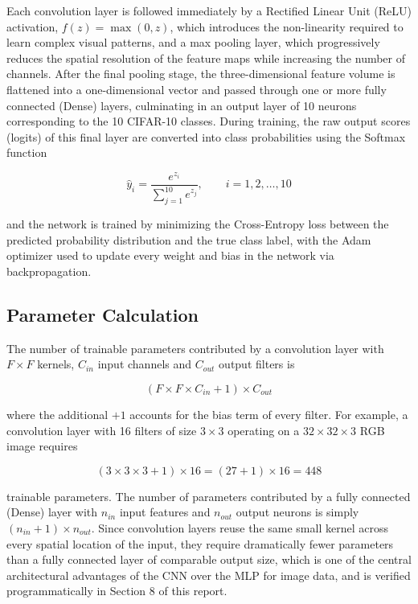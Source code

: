 \documentclass[11pt,a4paper]{article}
\begin{document}
Each convolution layer is followed immediately by a Rectified Linear Unit (ReLU) activation, $f(z) = \max(0,z)$, which introduces the non-linearity required to learn complex visual patterns, and a max pooling layer, which progressively reduces the spatial resolution of the feature maps while increasing the number of channels. After the final pooling stage, the three-dimensional feature volume is flattened into a one-dimensional vector and passed through one or more fully connected (Dense) layers, culminating in an output layer of 10 neurons corresponding to the 10 CIFAR-10 classes. During training, the raw output scores (logits) of this final layer are converted into class probabilities using the Softmax function

\[
\hat{y}_i = \frac{e^{z_i}}{\displaystyle\sum_{j=1}^{10} e^{z_j}}, \qquad i = 1,2,\dots,10
\]

and the network is trained by minimizing the Cross-Entropy loss between the predicted probability distribution and the true class label, with the Adam optimizer used to update every weight and bias in the network via backpropagation.

\subsection*{Parameter Calculation}

The number of trainable parameters contributed by a convolution layer with $F\times F$ kernels, $C_{in}$ input channels and $C_{out}$ output filters is

\[
\left(F \times F \times C_{in} + 1\right) \times C_{out}
\]

where the additional $+1$ accounts for the bias term of every filter. For example, a convolution layer with 16 filters of size $3\times3$ operating on a $32\times32\times3$ RGB image requires

\[
(3\times3\times3+1)\times16 = (27+1)\times16 = 448
\]

trainable parameters. The number of parameters contributed by a fully connected (Dense) layer with $n_{in}$ input features and $n_{out}$ output neurons is simply $(n_{in}+1)\times n_{out}$. Since convolution layers reuse the same small kernel across every spatial location of the input, they require dramatically fewer parameters than a fully connected layer of comparable output size, which is one of the central architectural advantages of the CNN over the MLP for image data, and is verified programmatically in Section 8 of this report.
\end{document}
